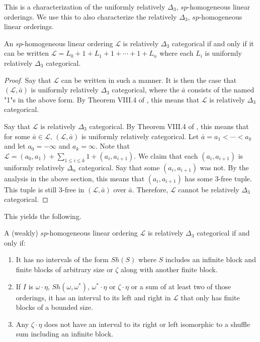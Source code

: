 \documentclass[11pt]{amsart}
\theoremstyle{definition}
\def\L{\mathcal L}
\begin{document}
This is a characterization of the uniformly relatively $\Delta_3$, $sp$-homogeneous linear orderings.
We use this to also characterize the relatively $\Delta_3$, $sp$-homogeneous linear orderings.


\begin{proposition}
    An $sp$-homogeneous linear ordering $\L$ is relatively $\Delta_3$ categorical if and only if it can be written $\L=L_0+1+L_1+1+\cdots+1+L_n$ where each $L_i$ is uniformly relatively $\Delta_3$ categorical.
\end{proposition}

\begin{proof}
    Say that $\L$ can be written in such a manner.
    It is then the case that $(\L,\bar{a})$ is uniformly relatively $\Delta_3$ categorical, where the $\bar{a}$ consists of the named "1"s in the above form.
    By Theorem VIII.4 of \cite{cst1}, this means that $\L$ is relatively $\Delta_3$ categorical.

    Say that $\L$ is relatively $\Delta_3$ categorical.
    By Theorem VIII.4 of \cite{cst1}, this means that for some $\bar{a}\in\L$,  $(\L,\bar{a})$ is uniformly relatively categorical.
    Let $\bar{a}=a_1<\cdots<a_k$ and let $a_0=-\infty$ and $a_k=\infty$.
    Note that $\L=(a_0,a_1)+\sum_{1\leq i\leq k}1+(a_i,a_{i+1})$.
    We claim that each $(a_i,a_{i+1})$ is uniformly relatively $\Delta_\alpha$ categorical.
    Say that some $(a_i,a_{i+1})$ was not.
    By the analysis in the above section, this means that $(a_i,a_{i+1})$ has some 3-free tuple.
    This tuple is still 3-free in $(\L,\bar{a})$ over $\bar{a}$.
    Therefore, $\L$ cannot be relatively $\Delta_3$ categorical.
\end{proof}

This yields the following.

 \begin{theorem} \label{spd3}
        A (weakly) $sp$-homogeneous linear ordering $\L$ is relatively $\Delta_3$ categorical if and only if: 
        \begin{enumerate}
            \item It has no intervals of the form $Sh(S)$ where $S$ includes an infinite block and finite blocks of arbitrary size or $\zeta$ along with another finite block.
            \item If $I$ is $\omega\cdot\eta$, $Sh(\omega,\omega^*)$, $\omega^*\cdot\eta$ or $\zeta\cdot\eta$ or a sum of at least two of those orderings, it has an interval to its left and right in $\L$ that only has finite blocks of a bounded size.
            \item Any $\zeta\cdot\eta$ does not have an interval to its right or left isomorphic to a shuffle sum including an infinite block.
        \end{enumerate}
    \end{theorem}
\end{document}
